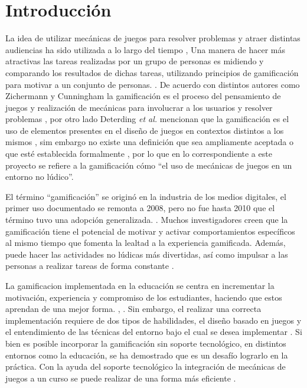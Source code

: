 
\section{Introducción}

    \noindent
    La idea de utilizar mecánicas de juegos para resolver problemas y atraer
    distintas audiencias ha sido utilizada a lo largo del tiempo \cite{GamByDesign},
%
    Una manera de hacer más atractivas las tareas realizadas por un grupo de
    personas es midiendo y comparando los resultados de dichas tareas, utilizando
    principios de gamificación para motivar a un conjunto de personas.
    \cite[p. 7]{Octalysis}.
%
    De acuerdo con distintos autores como Zichermann y Cunningham la gamificación es
    el proceso del pensamiento de juegos y realización de mecánicas para involucrar
    a los usuarios y resolver problemas \cite{GamByDesign}, por otro lado Deterding
    {\it et al.} mencionan que la gamificación es el uso de elementos presentes en
    el diseño de juegos en contextos distintos a los mismos \cite{DeterdingDefinition},
    sim embargo no existe una definición que sea ampliamente aceptada o que esté
    establecida formalmente \cite{Seaborn}, por lo que en lo correspondiente a este
    proyecto se refiere a la gamificación cómo ``el uso de mecánicas  de juegos en
    un entorno no lúdico''.\par
%
    \noindent 
    El término ``gamificación'' se originó en la industria de los medios digitales,
    el primer uso documentado se remonta a 2008, pero no fue hasta 2010 que el
    término tuvo una adopción generalizada. \cite{DeterdingGamefulness}. Muchos
    investigadores creen que la gamificación tiene el potencial de motivar y activar
    comportamientos específicos al mismo tiempo que fomenta la lealtad a la
    experiencia gamificada. Además, puede hacer las actividades no lúdicas más
    divertidas, así como impulsar a las personas a realizar tareas de forma
    constante \cite{Aldemir}.\par
%
    \noindent
    La gamificacion implementada en la educación se centra en incrementar la
    motivación, experiencia y compromiso de los estudiantes, haciendo que estos
    aprendan de una mejor forma. \cite{GamInE-Learning}, \cite{Lee}.
%
    Sin embargo, el realizar una correcta implementación requiere de dos tipos
    de habilidades, el diseño basado en juegos y el entendimiento de las técnicas
    del entorno bajo el cual se desea implementar \cite[p. 7]{ForTheWin}.
%
    Si bien es posible incorporar la gamificación sin soporte tecnológico,
    en distintos entornos como la educación, se ha demostrado que es un desafío
    lograrlo en la práctica. Con la ayuda del soporte tecnológico la integración
    de mecánicas de juegos a un curso se puede realizar de una forma más eficiente
    \cite{Wood-Reiners}.
